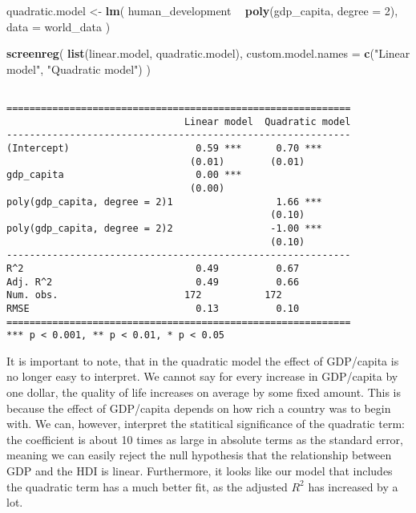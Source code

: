\documentclass[]{article}
\newenvironment{Shaded}{\begin{snugshade}}{\end{snugshade}}
\newcommand{\DataTypeTok}[1]{\textcolor[rgb]{0.13,0.29,0.53}{#1}}
\newcommand{\DecValTok}[1]{\textcolor[rgb]{0.00,0.00,0.81}{#1}}
\newcommand{\KeywordTok}[1]{\textcolor[rgb]{0.13,0.29,0.53}{\textbf{#1}}}
\newcommand{\NormalTok}[1]{#1}
\newcommand{\OperatorTok}[1]{\textcolor[rgb]{0.81,0.36,0.00}{\textbf{#1}}}
\newcommand{\StringTok}[1]{\textcolor[rgb]{0.31,0.60,0.02}{#1}}
\begin{document}
\begin{Shaded}
\begin{Highlighting}[]
\NormalTok{quadratic.model <-}\StringTok{ }\KeywordTok{lm}\NormalTok{(}
\NormalTok{  human_development }\OperatorTok{~}\StringTok{ }\KeywordTok{poly}\NormalTok{(gdp_capita, }\DataTypeTok{degree =} \DecValTok{2}\NormalTok{), }
  \DataTypeTok{data =}\NormalTok{ world_data}
\NormalTok{)}


\KeywordTok{screenreg}\NormalTok{(}
  \KeywordTok{list}\NormalTok{(linear.model, quadratic.model), }
  \DataTypeTok{custom.model.names =} \KeywordTok{c}\NormalTok{(}\StringTok{"Linear model"}\NormalTok{, }\StringTok{"Quadratic model"}\NormalTok{)}
\NormalTok{)}
\end{Highlighting}
\end{Shaded}

\begin{verbatim}

============================================================
                               Linear model  Quadratic model
------------------------------------------------------------
(Intercept)                      0.59 ***      0.70 ***     
                                (0.01)        (0.01)        
gdp_capita                       0.00 ***                   
                                (0.00)                      
poly(gdp_capita, degree = 2)1                  1.66 ***     
                                              (0.10)        
poly(gdp_capita, degree = 2)2                 -1.00 ***     
                                              (0.10)        
------------------------------------------------------------
R^2                              0.49          0.67         
Adj. R^2                         0.49          0.66         
Num. obs.                      172           172            
RMSE                             0.13          0.10         
============================================================
*** p < 0.001, ** p < 0.01, * p < 0.05
\end{verbatim}

It is important to note, that in the quadratic model the effect of GDP/capita is no longer easy to interpret. We cannot say for every increase in GDP/capita by one dollar, the quality of life increases on average by some fixed amount. This is because the effect of GDP/capita depends on how rich a country was to begin with. We can, however, interpret the statitical significance of the quadratic term: the coefficient is about 10 times as large in absolute terms as the standard error, meaning we can easily reject the null hypothesis that the relationship between GDP and the HDI is linear. Furthermore, it looks like our model that includes the quadratic term has a much better fit, as the adjusted \(R^2\) has increased by a lot.
\end{document}
